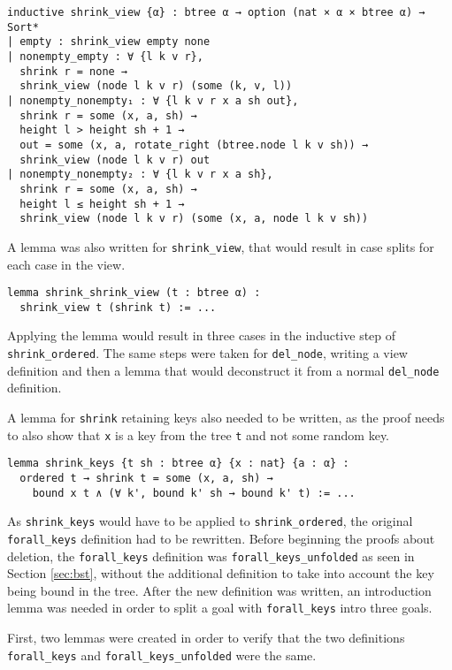 \begin{lstlisting}
inductive shrink_view {α} : btree α → option (nat × α × btree α) → Sort*
| empty : shrink_view empty none
| nonempty_empty : ∀ {l k v r},
  shrink r = none →
  shrink_view (node l k v r) (some (k, v, l))
| nonempty_nonempty₁ : ∀ {l k v r x a sh out},
  shrink r = some (x, a, sh) →
  height l > height sh + 1 →
  out = some (x, a, rotate_right (btree.node l k v sh)) →
  shrink_view (node l k v r) out
| nonempty_nonempty₂ : ∀ {l k v r x a sh},
  shrink r = some (x, a, sh) →
  height l ≤ height sh + 1 →
  shrink_view (node l k v r) (some (x, a, node l k v sh))
\end{lstlisting}

A lemma was also written for \lstinline{shrink_view}, that would result in case splits for each case in the view. 

\begin{lstlisting}
lemma shrink_shrink_view (t : btree α) : 
  shrink_view t (shrink t) := ...
\end{lstlisting}

Applying the lemma would result in three cases in the inductive step of \lstinline{shrink_ordered}. The same steps were taken for \lstinline{del_node}, writing a view definition and then a lemma that would deconstruct it from a normal \lstinline{del_node} definition.

A lemma for \lstinline{shrink} retaining keys also needed to be written, as the proof needs to also show that \lstinline{x} is a key from the tree \lstinline{t} and not some random key.

\begin{lstlisting}
lemma shrink_keys {t sh : btree α} {x : nat} {a : α} :
  ordered t → shrink t = some (x, a, sh) → 
    bound x t ∧ (∀ k', bound k' sh → bound k' t) := ...
\end{lstlisting}

As \lstinline{shrink_keys} would have to be applied to \lstinline{shrink_ordered}, the original \lstinline{forall_keys} definition had to be rewritten. Before beginning the proofs about deletion, the \lstinline{forall_keys} definition was \lstinline{forall_keys_unfolded} as seen in Section \ref{sec:bst}, without the additional definition to take into account the key being bound in the tree. After the new definition was written, an introduction lemma was needed in order to split a goal with \lstinline{forall_keys} intro three goals. 

First, two lemmas were created in order to verify that the two definitions \lstinline{forall_keys} and \lstinline{forall_keys_unfolded} were the same. 

